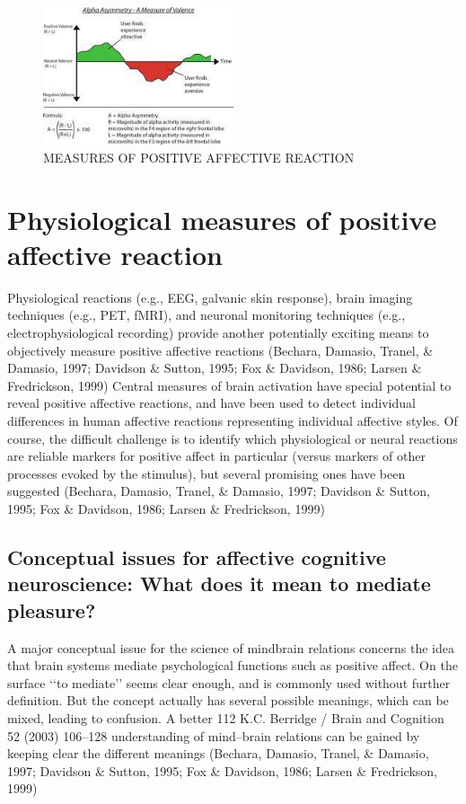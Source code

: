 \documentclass[conference]{IEEEtran}
\begin{document}
\begin{figure}[h]
  \centering
  \includegraphics[width=0.5\textwidth]{pic-3.jpeg}
  \caption{MEASURES OF POSITIVE AFFECTIVE
REACTION}
  \label{fig:example}
\end{figure}





\section{Physiological measures of positive affective reaction}

Physiological reactions (e.g., EEG, galvanic skin response), brain imaging techniques (e.g., PET, fMRI),
and neuronal monitoring techniques (e.g., electrophysiological recording) provide another potentially exciting
means to objectively measure positive affective reactions
(Bechara, Damasio, Tranel, \& Damasio, 1997; Davidson \& Sutton, 1995; Fox \& Davidson, 1986; Larsen \& Fredrickson, 1999)
 Central measures of brain activation
have special potential to reveal positive affective reactions, and have been used to detect individual differences
in human affective reactions representing individual affective styles. Of course, the
difficult challenge is to identify which physiological or
neural reactions are reliable markers for positive affect
in particular (versus markers of other processes evoked
by the stimulus), but several promising ones have been
suggested (Bechara, Damasio, Tranel, \& Damasio, 1997; Davidson \& Sutton, 1995; Fox \& Davidson, 1986; Larsen \& Fredrickson, 1999)



\subsection{Conceptual issues for affective cognitive neuroscience: What does it mean to mediate pleasure?}


A major conceptual issue for the science of mindbrain relations concerns the idea that brain systems
mediate psychological functions such as positive affect.
On the surface ‘‘to mediate’’ seems clear enough, and is
commonly used without further definition. But the
concept actually has several possible meanings,
which can be mixed, leading to confusion. A better
112 K.C. Berridge / Brain and Cognition 52 (2003) 106–128
understanding of mind–brain relations can be gained by
keeping clear the different meanings  (Bechara, Damasio, Tranel, \& Damasio, 1997; Davidson \& Sutton, 1995; Fox \& Davidson, 1986; Larsen \& Fredrickson, 1999)
\end{document}
